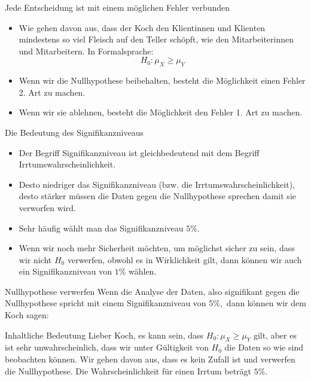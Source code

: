 \documentclass[usenames,dvipsnames,handout]{beamer}
\begin{document}
\begin{frame}{Jede Entscheidung ist mit einem möglichen Fehler verbunden}

\begin{itemize}
\item{Wie gehen davon aus, dass der Koch den Klientinnen und Klienten mindestens so viel Fleisch auf den Teller
schöpft, wie den Mitarbeiterinnen und Mitarbeitern. In Formalsprache: $$H_{0}: \mu_{X} \geq \mu_{Y}$$ }\pause
\item{Wenn wir die Nullhypothese beibehalten, besteht die Möglichkeit einen Fehler 2. Art zu machen.}\pause
\item{Wenn wir sie ablehnen, besteht die Möglichkeit den Fehler 1. Art zu machen.}
\end{itemize}
\end{frame}


\begin{frame}{Die Bedeutung des Signifikanzniveaus}
\begin{itemize}
\item{Der Begriff Signifikanzniveau ist gleichbedeutend mit dem Begriff Irrtumswahrscheinlichkeit.}\pause
\item{Desto niedriger das Signifikanzniveau (bzw. die Irrtumswahrscheinlichkeit), desto stärker müssen 
die Daten gegen die Nullhypothese sprechen damit sie verworfen wird.}\pause
\item{Sehr häufig wählt man das Signifikanzniveau $5\%.$}\pause
\item{Wenn wir noch mehr Sicherheit möchten, um möglichst sicher zu sein, dass wir nicht 
$H_{0}$ verwerfen, obwohl es in Wirklichkeit gilt, dann können wir auch ein Signifikanzniveau von $1\%$ wählen.}
\end{itemize}
\end{frame}

\begin{frame}{Nullhypothese verwerfen}
Wenn die Analyse der Daten, also signifikant gegen die Nullhypothese spricht mit einem Signifikanzniveau von 
$5\%,$ dann können wir dem Koch sagen:
\begin{block}{Inhaltliche Bedeutung}
Lieber Koch, es kann sein, dass $H_{0}: \mu_{X} \geq \mu_{Y}$ gilt, aber es ist sehr unwahrscheinlich, dass wir 
unter Gültigkeit von $H_{0}$ die Daten so wie sind beobachten können. Wir gehen davon aus, dass es kein Zufall ist und verwerfen
die Nullhypothese. Die Wahrscheinlichkeit für einen Irrtum beträgt $5\%.$
\end{block}
\end{frame}
\end{document}
